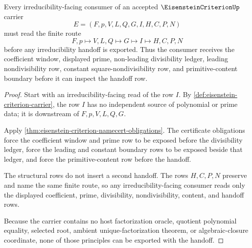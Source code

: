 \begin{theorem}
\label{thm:eisenstein-criterion-prime-divisibility-route}
Every irreducibility-facing consumer of an accepted $\EisensteinCriterionUp$ carrier
$$
E=(F,p,V,L,Q,G,I,H,C,P,N)
$$
must read the finite route
$$
F,p \longmapsto V,L,Q \longmapsto G \longmapsto I \longmapsto H,C,P,N
$$
before any irreducibility handoff is exported. Thus the consumer receives the coefficient window, displayed prime, non-leading divisibility ledger, leading nondivisibility row, constant square-nondivisibility row, and primitive-content boundary before it can inspect the handoff row.
\end{theorem}
\begin{proof}
Start with an irreducibility-facing read of the row $I$. By \autoref{def:eisenstein-criterion-carrier}, the row $I$ has no independent source of polynomial or prime data; it is downstream of $F,p,V,L,Q,G$.

Apply \autoref{thm:eisenstein-criterion-namecert-obligations}. The certificate obligations force the coefficient window and prime row to be exposed before the divisibility ledger, force the leading and constant boundary rows to be exposed beside that ledger, and force the primitive-content row before the handoff.

The structural rows do not insert a second handoff. The rows $H,C,P,N$ preserve and name the same finite route, so any irreducibility-facing consumer reads only the displayed coefficient, prime, divisibility, nondivisibility, content, and handoff rows.

Because the carrier contains no host factorization oracle, quotient polynomial equality, selected root, ambient unique-factorization theorem, or algebraic-closure coordinate, none of those principles can be exported with the handoff.
\end{proof}



